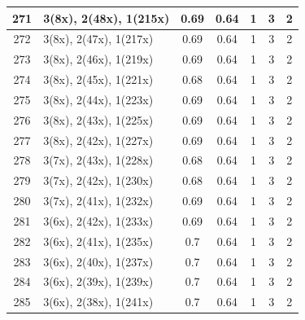 \begin{small}
\begin{longtable}{|c|p{4cm}|c|c|c|c|c|}
  271 & 3(8x), 2(48x), 1(215x) & \cellcolor{colorBad}  0.69 & \cellcolor{colorBad} 0.64 & 1 & 3 & \cellcolor{colorGood} 2 \\   \hline
  272 & 3(8x), 2(47x), 1(217x) & \cellcolor{colorBad}  0.69 & \cellcolor{colorBad} 0.64 & 1 & 3 & \cellcolor{colorGood} 2 \\   \hline
  273 & 3(8x), 2(46x), 1(219x) & \cellcolor{colorBad}  0.69 & \cellcolor{colorBad} 0.64 & 1 & 3 & \cellcolor{colorGood} 2 \\   \hline
  274 & 3(8x), 2(45x), 1(221x) & \cellcolor{colorBad}  0.68 & \cellcolor{colorBad} 0.64 & 1 & 3 & \cellcolor{colorGood} 2 \\   \hline
  275 & 3(8x), 2(44x), 1(223x) & \cellcolor{colorBad}  0.69 & \cellcolor{colorBad} 0.64 & 1 & 3 & \cellcolor{colorGood} 2 \\   \hline
  276 & 3(8x), 2(43x), 1(225x) & \cellcolor{colorBad}  0.69 & \cellcolor{colorBad} 0.64 & 1 & 3 & \cellcolor{colorGood} 2 \\   \hline
  277 & 3(8x), 2(42x), 1(227x) & \cellcolor{colorBad}  0.69 & \cellcolor{colorBad} 0.64 & 1 & 3 & \cellcolor{colorGood} 2 \\   \hline
  278 & 3(7x), 2(43x), 1(228x) & \cellcolor{colorBad}  0.68 & \cellcolor{colorBad} 0.64 & 1 & 3 & \cellcolor{colorGood} 2 \\   \hline
  279 & 3(7x), 2(42x), 1(230x) & \cellcolor{colorBad}  0.68 & \cellcolor{colorBad} 0.64 & 1 & 3 & \cellcolor{colorGood} 2 \\   \hline
  280 & 3(7x), 2(41x), 1(232x) & \cellcolor{colorBad}  0.69 & \cellcolor{colorBad} 0.64 & 1 & 3 & \cellcolor{colorGood} 2 \\   \hline
  281 & 3(6x), 2(42x), 1(233x) & \cellcolor{colorBad}  0.69 & \cellcolor{colorBad} 0.64 & 1 & 3 & \cellcolor{colorGood} 2 \\   \hline
  282 & 3(6x), 2(41x), 1(235x) & \cellcolor{colorBad}  0.7 & \cellcolor{colorBad} 0.64 & 1 & 3 & \cellcolor{colorGood} 2 \\   \hline
  283 & 3(6x), 2(40x), 1(237x) & \cellcolor{colorBad}  0.7 & \cellcolor{colorBad} 0.64 & 1 & 3 & \cellcolor{colorGood} 2 \\   \hline
  284 & 3(6x), 2(39x), 1(239x) & \cellcolor{colorBad}  0.7 & \cellcolor{colorBad} 0.64 & 1 & 3 & \cellcolor{colorGood} 2 \\   \hline
  285 & 3(6x), 2(38x), 1(241x) & \cellcolor{colorBad}  0.7 & \cellcolor{colorBad} 0.64 & 1 & 3 & \cellcolor{colorGood} 2 \\   \hline

\end{longtable}
\end{small}
